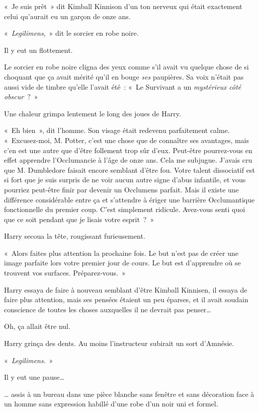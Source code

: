 «~Je suis prêt~» dit Kimball Kinnison d'un ton nerveux qui était exactement celui qu'aurait eu un garçon de onze ans.

«~\emph{Legilimens},~» dit le sorcier en robe noire.

Il y eut un flottement.

Le sorcier en robe noire cligna des yeux comme s'il avait vu quelque chose de si choquant que ça avait mérité qu'il en bouge \emph{ses} paupières.
Sa voix n'était pas aussi vide de timbre qu'elle l'avait été~: «~Le Survivant a un \emph{mystérieux} \emph{côté obscur}~?~»

Une chaleur grimpa lentement le long des joues de Harry.

«~Eh bien~», dit l'homme.
Son visage était redevenu parfaitement calme.
«~Excusez-moi, M. Potter, c'est une chose que de connaître ses avantages, mais c'en est une autre que d'être follement trop sûr d'eux.
Peut-être pourrez-vous en effet apprendre l'Occlumancie à l'âge de onze ans.
Cela me subjugue.
J'avais cru que M. Dumbledore faisait encore semblant d'être fou.
Votre talent dissociatif est si fort que je suis surpris de ne voir aucun autre signe d'abus infantile, et vous pourriez peut-être finir par devenir un Occlumens parfait.
Mais il existe une différence considérable entre ça et s'attendre à ériger une barrière Occlumantique fonctionnelle du premier coup.
C'est simplement ridicule.
Avez-vous senti quoi que ce soit pendant que je lisais votre esprit~?~»

Harry secoua la tête, rougissant furieusement.

«~Alors faites plus attention la prochaine fois.
Le but n'est pas de créer une image parfaite lors votre premier jour de cours.
Le but est d'apprendre où se trouvent vos surfaces.
Préparez-vous.~»

Harry essaya de faire à nouveau semblant d'être Kimball Kinnisen, il essaya de faire plus attention, mais ses pensées étaient un peu éparses, et il avait soudain conscience de toutes les choses auxquelles il ne devrait pas penser…

Oh, ça allait être nul.

Harry grinça des dents.
Au moins l'instructeur subirait un sort d'Amnésie.

«~\emph{Legilimens}.~»

Il y eut une pause…

… assis à un bureau dans une pièce blanche sans fenêtre et sans décoration face à un homme sans expression habillé d’une robe d'un noir uni et formel.

